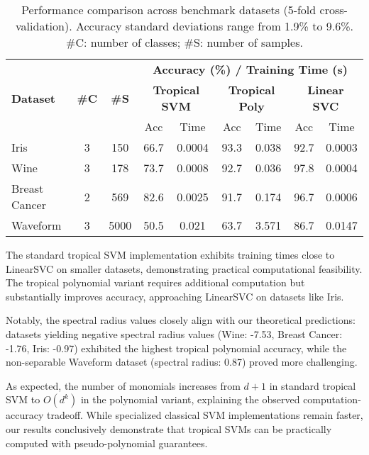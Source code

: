 \documentclass{article}
\begin{document}
\begin{table}[h]
\centering
\footnotesize
\begin{tabular}{@{}l@{\hskip 4pt}c@{\hskip 4pt}c@{\hskip 8pt}cc@{\hskip 8pt}cc@{\hskip 8pt}cc@{}}
\toprule
\multirow{3}{*}{\textbf{Dataset}} & \multirow{3}{*}{\textbf{\#C}} & \multirow{3}{*}{\textbf{\#S}} & \multicolumn{6}{c}{\textbf{Accuracy (\%) / Training Time (s)}} \\
\cmidrule(lr){4-9}
& & & \multicolumn{2}{c}{\textbf{Tropical SVM}} & \multicolumn{2}{c}{\textbf{Tropical Poly}} & \multicolumn{2}{c}{\textbf{Linear SVC}} \\
\cmidrule(lr){4-5} \cmidrule(lr){6-7} \cmidrule(lr){8-9}
& & & Acc & Time & Acc & Time & Acc & Time \\
\midrule
Iris & 3 & 150 & 66.7 & 0.0004 & 93.3 & 0.038 & 92.7 & 0.0003 \\
Wine & 3 & 178 & 73.7 & 0.0008 & 92.7 & 0.036 & 97.8 & 0.0004 \\
Breast Cancer & 2 & 569 & 82.6 & 0.0025 & 91.7 & 0.174 & 96.7 & 0.0006 \\
Waveform & 3 & 5000 & 50.5 & 0.021 & 63.7 & 3.571 & 86.7 & 0.0147 \\
\bottomrule
\end{tabular}
\vspace{0.5em}
\caption{Performance comparison across benchmark datasets (5-fold cross-validation). Accuracy standard deviations range from 1.9\% to 9.6\%. \#C: number of classes; \#S: number of samples.}
\label{tab:benchmark_results}
\end{table}

The standard tropical SVM implementation exhibits training times close to LinearSVC on smaller datasets, demonstrating practical computational feasibility. The tropical polynomial variant requires additional computation but substantially improves accuracy, approaching LinearSVC on datasets like Iris.

Notably, the spectral radius values closely align with our theoretical predictions: datasets yielding negative spectral radius values (Wine: -7.53, Breast Cancer: -1.76, Iris: -0.97) exhibited the highest tropical polynomial accuracy, while the non-separable Waveform dataset (spectral radius: 0.87) proved more challenging.

As expected, the number of monomials increases from $d+1$ in standard tropical SVM to $O(d^k)$ in the polynomial variant, explaining the observed computation-accuracy tradeoff. While specialized classical SVM implementations remain faster, our results conclusively demonstrate that tropical SVMs can be practically computed with pseudo-polynomial guarantees.
\end{document}
